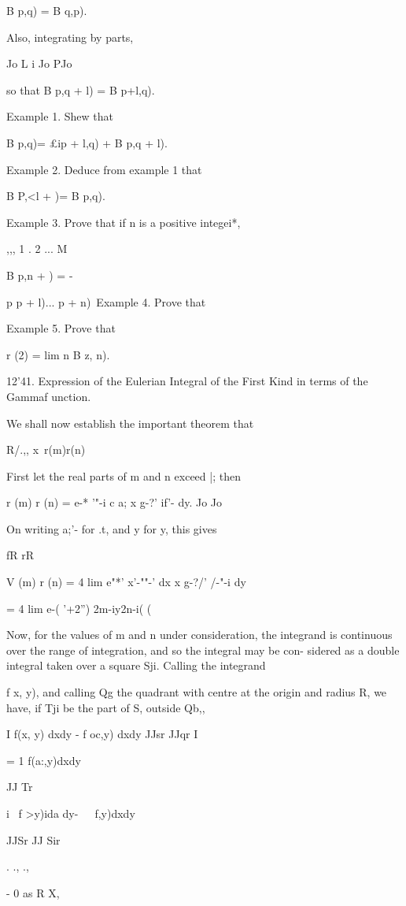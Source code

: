 B p,q) = B q,p).

Also, integrating by parts,

Jo L i Jo PJo

so that B p,q + l) = B p+l,q).

Example 1. Shew that

B p,q)= £ip + l,q) + B p,q + l).

Example 2. Deduce from example 1 that

B P,<l + )= B p,q).

Example 3. Prove that if n is a positive integei*,

,,, 1 . 2 ... M

B p,n + ) = -

p p + l)... p + n)\ Example 4. Prove that

Example 5. Prove that

r (2) = lim n B z, n).

12'41. Expression of the Eulerian Integral of the First Kind in terms
of the Gammaf unction.

We shall now establish the important theorem that

R/.,, x\ r(m)r(n)

First let the real parts of m and n exceed |; then

r (m) r (n) = e-* '"-i c a; x g-?' if'- dy. Jo Jo

On writing a;'- for .t, and y for y, this gives

fR rR

V (m) r (n) = 4 lim e"*' x'-""-' dx x g-?/' /-"-i dy

= 4 lim e-( '+2'') 2m-iy2n-i( ( \

Now, for the values of m and n under consideration, the integrand is
continuous over the range of integration, and so the integral may be
con- sidered as a double integral taken over a square Sji. Calling the
integrand

%
%

f x, y), and calling Qg the quadrant with centre at the origin and
radius R, we have, if Tji be the part of S, outside Qb,,

I f(x, y) dxdy - f oc,y) dxdy JJsr JJqr I

= 1 f(a:,y)dxdy

 JJ Tr

i \ f >y)ida dy-\ \ \ f,y)dxdy\

JJSr JJ Sir

  . ., .,

- 0 as R X,

